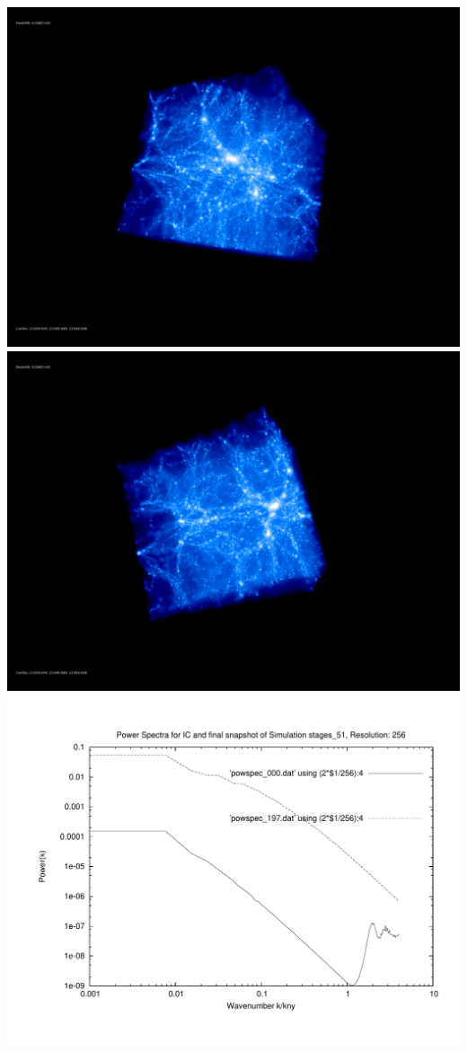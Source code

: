 \includegraphics[scale=0.1]{r256/h100/stages_51/rotate_00074.jpg} 
\includegraphics[scale=0.1]{r256/h100/stages_51/rotate_00131.jpg}  \\

\includegraphics[scale=0.5]{r256/h100/stages_51/plot_powspec_stages_51}

